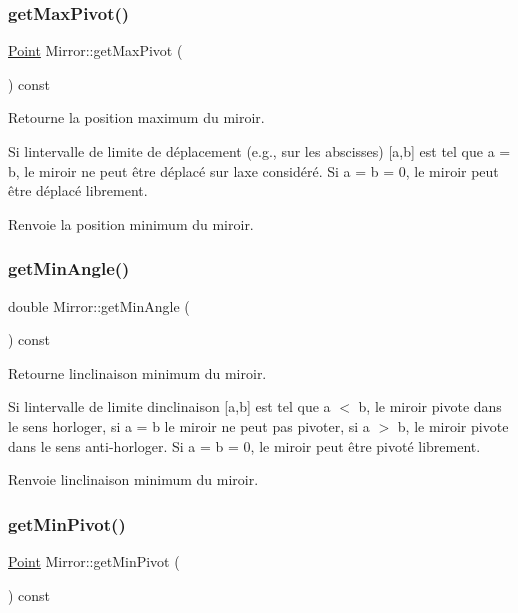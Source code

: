 \subsubsection{\texorpdfstring{getMaxPivot()}{getMaxPivot()}}
{\footnotesize\ttfamily \mbox{\hyperlink{class_point}{Point}} Mirror\+::get\+Max\+Pivot (\begin{DoxyParamCaption}{ }\end{DoxyParamCaption}) const}

Retourne la position maximum du miroir. 

Si l\textquotesingle{}intervalle de limite de déplacement (e.\+g., sur les abscisses) \mbox{[}a,b\mbox{]} est tel que a = b, le miroir ne peut être déplacé sur l\textquotesingle{}axe considéré. Si a = b = 0, le miroir peut être déplacé librement. \begin{DoxyReturn}{Renvoie}
la position minimum du miroir. 
\end{DoxyReturn}
\mbox{\label{class_mirror_ac810eb7d7cc4377e7513cb5de32808de}} 
\subsubsection{\texorpdfstring{getMinAngle()}{getMinAngle()}}
{\footnotesize\ttfamily double Mirror\+::get\+Min\+Angle (\begin{DoxyParamCaption}{ }\end{DoxyParamCaption}) const}

Retourne l\textquotesingle{}inclinaison minimum du miroir. 

Si l\textquotesingle{}intervalle de limite d\textquotesingle{}inclinaison \mbox{[}a,b\mbox{]} est tel que a $<$ b, le miroir pivote dans le sens horloger, si a = b le miroir ne peut pas pivoter, si a $>$ b, le miroir pivote dans le sens anti-\/horloger. Si a = b = 0, le miroir peut être pivoté librement. \begin{DoxyReturn}{Renvoie}
l\textquotesingle{}inclinaison minimum du miroir. 
\end{DoxyReturn}
\mbox{\label{class_mirror_ae978b1372db039cb296348062425171c}} 
\subsubsection{\texorpdfstring{getMinPivot()}{getMinPivot()}}
{\footnotesize\ttfamily \mbox{\hyperlink{class_point}{Point}} Mirror\+::get\+Min\+Pivot (\begin{DoxyParamCaption}{ }\end{DoxyParamCaption}) const}

